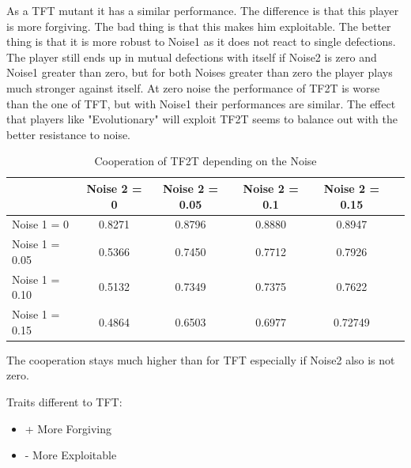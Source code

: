 \documentclass[11pt,twoside]{article}
\begin{document}
As a TFT mutant it has a similar performance. The difference is that this player is more forgiving. The bad thing is that this makes him exploitable. The better thing is that it is more robust to Noise1 as it does not react to single defections. The player still ends up in mutual defections with itself if Noise2 is zero and Noise1 greater than zero, but for both Noises greater than zero the player plays much stronger against itself. At zero noise the performance of TF2T is worse than the one of TFT, but with Noise1 their performances are similar. The effect that players like "Evolutionary" will exploit TF2T seems to balance out with the better resistance to noise.

\begin{table}[h]
 \begin{center}
\caption{Cooperation of TF2T depending on the Noise} \vspace{3mm}
\begin{tabular}{|l|c|c|c|c|c|}
\hline
   	& Noise 2 = 0 & Noise 2 = 0.05& Noise 2 = 0.1& Noise 2 = 0.15 \\
  \hline
  Noise 1 = 0 	&        0.8271&    0.8796 &   0.8880  & 0.8947 \\
 \hline
  Noise 1 = 0.05	 &       0.5366  &  0.7450  &  0.7712 &   0.7926 \\
 \hline
  Noise 1 = 0.10 	&    0.5132 &   0.7349  &  0.7375&   0.7622 \\
 \hline
  Noise 1 = 0.15 	&     0.4864 &   0.6503 &   0.6977   & 0.72749 \\
 \hline
\end{tabular}
 \end{center}
\end{table}

The cooperation stays much higher than for TFT especially if Noise2 also is not zero.

Traits different to TFT:

\renewcommand{\labelitemi}{}
\begin{itemize}
	\item + More Forgiving
	\item - More Exploitable
\end{itemize}
\renewcommand{\labelitemi}{$\bullet$}

\newpage
\end{document}
